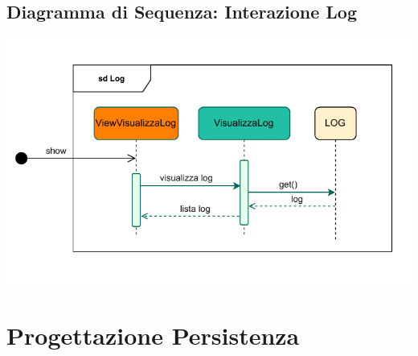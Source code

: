 \subsection*{Diagramma di Sequenza: Interazione Log}
{}
\vspace{1.5cm}
\begin{adjustwidth}{0cm}{0cm}
\includegraphics[scale=1]{progettazione/Diagramma-Sequenza-Interazione-Log.drawio.pdf}
\end{adjustwidth}
\vspace{0.5cm}




\pagebreak
\section*{Progettazione Persistenza}
{}
